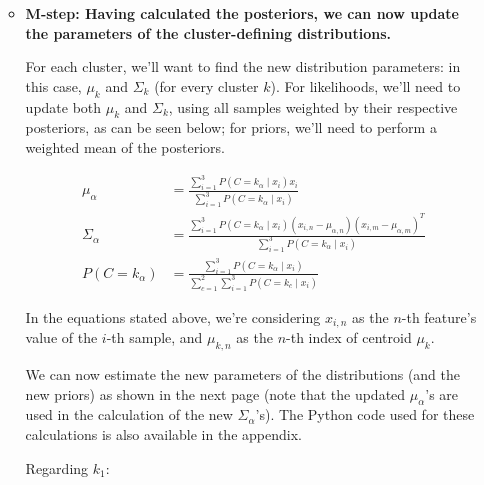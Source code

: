 \documentclass[12pt]{article}
\begin{document}
\begin{enumerate}[leftmargin=\labelsep]
\begin{itemize}[leftmargin=]
\begin{paracol}{2}
                \end{paracol}

          \item \textbf{M-step: Having calculated the posteriors, we can now
                  update the parameters of the cluster-defining distributions.}

                For each cluster, we'll want to find the new distribution parameters:
                in this case, $\mu_k$ and $\Sigma_k$ (for every cluster $k$).
                For likelihoods, we'll need to update both $\mu_k$ and $\Sigma_k$,
                using all samples weighted by their respective posteriors, as can be seen below;
                for priors, we'll need to perform a weighted mean of the posteriors.

                \begin{equation*}
                  \begin{aligned}
                    \mu_\alpha      & = \frac{\sum_{i=1}^3 P(C = k_\alpha \mid x_i) x_i}{\sum_{i=1}^3 P(C = k_\alpha \mid x_i)}                                                         \\
                    \Sigma_\alpha   & = \frac{\sum_{i=1}^3 P(C = k_\alpha \mid x_i) (x_{i, n} - \mu_{\alpha, n}) (x_{i, m} - \mu_{\alpha, m})^T}{\sum_{i=1}^3 P(C = k_\alpha \mid x_i)} \\
                    P(C = k_\alpha) & = \frac{\sum_{i=1}^3 P(C = k_\alpha \mid x_i)}{\sum_{c=1}^2\sum_{i=1}^3 P(C = k_c \mid x_i)}
                  \end{aligned}
                \end{equation*}

                In the equations stated above, we're considering $x_{i, n}$ as the $n$-th
                feature's value of the $i$-th sample, and $\mu_{k, n}$ as the $n$-th
                index of centroid $\mu_k$.

                We can now estimate the new parameters of the distributions (and the new
                priors) as shown in the next page (note that the updated $\mu_\alpha$'s are used
                in the calculation of the new $\Sigma_\alpha$'s).
                The Python code used for these calculations is also
                available in the appendix.

                \pagebreak

                Regarding $k_1$:


\end{itemize}
\end{enumerate}
\end{document}
